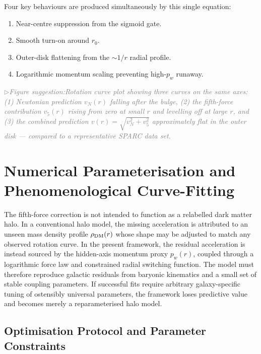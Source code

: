\documentclass[11pt,a4paper]{article}
\newcommand{\pw}{p_w}                        %
\newcommand{\vfive}{v_5}                     %
\newcommand{\vN}{v_N}                        %
\newcommand{\figsuggest}[1]{%
  \medskip
  \noindent\hspace{0pt}\textcolor{gray}{\small\itshape
    $\triangleright$\;Figure suggestion:\enspace #1}%
  \medskip}
\begin{document}
\medskip
Four key behaviours are produced simultaneously by this single equation:

\begin{enumerate}[leftmargin=1.5em]
  \item Near-centre suppression from the sigmoid gate.
  \item Smooth turn-on around $r_0$.
  \item Outer-disk flattening from the $\sim 1/r$ radial profile.
  \item Logarithmic momentum scaling preventing high-$\pw$ runaway.
\end{enumerate}

\figsuggest{Rotation curve plot showing three curves on the same axes: (1)
Newtonian prediction $\vN(r)$ falling after the bulge, (2) the fifth-force
contribution $\vfive(r)$ rising from zero at small $r$ and levelling off at
large $r$, and (3) the combined prediction $v(r) = \sqrt{\vN^2 + \vfive^2}$
approximately flat in the outer disk --- compared to a representative SPARC
data set.}

\section{Numerical Parameterisation and Phenomenological Curve-Fitting}%
\label{sec:fitting}

\noindent
The fifth-force correction is not intended to function as a relabelled dark
matter halo.  In a conventional halo model, the missing acceleration is
attributed to an unseen mass density profile $\rho_{\rm DM}(r)$ whose shape
may be adjusted to match any observed rotation curve.  In the present
framework, the residual acceleration is instead sourced by the hidden-axis
momentum proxy $\pw(r)$, coupled through a logarithmic force law and
constrained radial switching function.  The model must therefore reproduce
galactic residuals from baryonic kinematics and a small set of stable coupling
parameters.  If successful fits require arbitrary galaxy-specific tuning of
ostensibly universal parameters, the framework loses predictive value and
becomes merely a reparameterised halo model.

\subsection{Optimisation Protocol and Parameter Constraints}\label{sec:optim}
\end{document}
